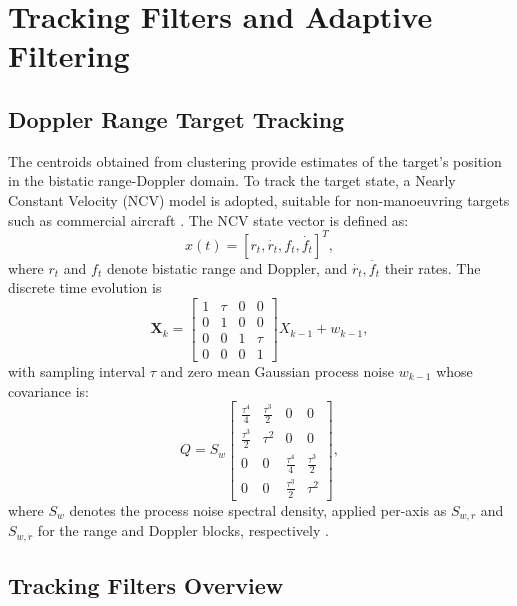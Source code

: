 \documentclass[conference]{IEEEtran}
\begin{document}
\section{Tracking Filters and Adaptive Filtering}

\subsection{Doppler Range Target Tracking}

The centroids obtained from clustering provide estimates of the target's position in the bistatic range-Doppler domain. To track the target state, a Nearly Constant Velocity (NCV) model is adopted, suitable for non-manoeuvring targets such as commercial aircraft \cite{Li2003a}. The NCV state vector is defined as:
\begin{equation}
  x(t) = [r_t, \dot{r_t}, f_t, \dot{f_t}]^T,
\end{equation}
where $r_t$ and $f_t$ denote bistatic range and Doppler, and $\dot{r_t}, \dot{f_t}$ their rates. The discrete time evolution is
\begin{equation}
  \mathbf{X}_k =
  \begin{bmatrix}
      1 & \tau & 0 & 0 \\
      0 & 1 & 0 & 0 \\
      0 & 0 & 1 & \tau \\
      0 & 0 & 0 & 1
  \end{bmatrix} X_{k-1} + w_{k-1},
\end{equation}
with sampling interval $\tau$ and zero mean Gaussian process noise $w_{k-1}$ whose covariance is:
\begin{equation}
  Q = S_w
  \begin{bmatrix}
      \tfrac{\tau^4}{4} & \tfrac{\tau^3}{2} & 0 & 0 \\
      \tfrac{\tau^3}{2} & \tau^2 & 0 & 0 \\
      0 & 0 & \tfrac{\tau^4}{4} & \tfrac{\tau^3}{2} \\
      0 & 0 & \tfrac{\tau^3}{2} & \tau^2
  \end{bmatrix},
\end{equation}
where $S_w$ denotes the process noise spectral density, applied per-axis as $S_{w,r}$ and $S_{w,\dot{r}}$ for the range and Doppler blocks, respectively \cite{Measurements2023b}.

\subsection{Tracking Filters Overview}
\end{document}
